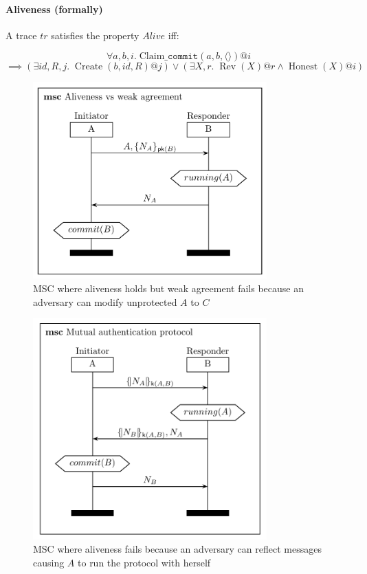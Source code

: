 \paragraph{Aliveness (formally)}
A trace $tr$ satisfies the property $Alive$ iff:
\begin{tcolorbox}
$$ \forall a, b, i. \; \text{Claim\_}\texttt{commit}(a, b, \langle\rangle)@i $$
$$ \implies (\exists id, R, j.  \; \operatorname{Create}(b, id, R)@j) \vee (\exists X, r . \; \operatorname{Rev}(X)@r \wedge \operatorname{Honest}(X)@i) $$
\end{tcolorbox}

\begin{figure}[h]
    \centering
    \includegraphics[width=9cm]{images/ch7-msc-auth-alive-not-weak.png}
    \caption{MSC where aliveness holds but weak agreement fails because an adversary can modify unprotected $A$ to $C$}
    \label{fig:msc-auth-alive-not-weak}
\end{figure}

\begin{figure}[h]
    \centering
    \includegraphics[width=9cm]{images/ch7-msc-auth-not-alive.png}
    \caption{MSC where aliveness fails because an adversary can reflect messages causing $A$ to run the protocol with herself}
    \label{fig:msc-auth-not-alive}
\end{figure}

